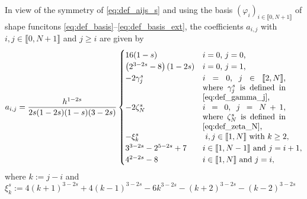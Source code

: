 \documentclass[11 pt]{article}
\newcommand\inter[1]{\llbracket #1\rrbracket}
\numberwithin{equation}{section}
\begin{document}
%
In view of the symmetry of \eqref{eq:def_aijs_s} and using the basis $(\varphi_i)_{i\in\inter{0,N+1}}$ of shape funcitons \eqref{eq:def_basis}--\eqref{eq:def_basis_ext}, the coefficients $a_{i,j}$ with $i,j\in\inter{0,N+1}$ and $j\geq i$ are given by
%
%
\begin{equation}
a_{i,j}= \frac{h^{1 - 2 s}}{2s(1-2s)(1-s)(3-2s)}
\begin{cases}
16(1-s) & \textnormal{$i=0$, $j=0$,} \\ 
\left(2^{3-2 s}-8\right)(1-2s) & \textnormal{$i=0$, $j=1$,} \\
-2\gamma_j^s  & \parbox[t]{.3\columnwidth}{$i=0$, $j\in\inter{2,N}$, where $\gamma_j^s$ is defined in \eqref{eq:def_gamma_j},}\\
-2\zeta^s_{N}  & \parbox[t]{.3\columnwidth}{$i=0$, $j=N+1$, where $\zeta_N^s$ is defined in \eqref{eq:def_zeta_N},}\\
-\xi_k^s & \textnormal{ $i,j\in\inter{1,N}$ with $k\geq 2$,} \\
3^{3-2s}-2^{5-2s}+7 & \textnormal{$i\in\inter{1,N-1}$ and $j=i+1$,} \\
4^{2-2s}-8 & \textnormal{$i\in\inter{1,N}$ and $j=i$,}
\end{cases}
\end{equation}
where $k:=j-i$ and $\xi^s_k:=4(k+1)^{3-2s} + 4(k-1)^{3-2s}-6k^{3-2s}-(k+2)^{3-2s}-(k-2)^{3-2s}$
\end{document}
